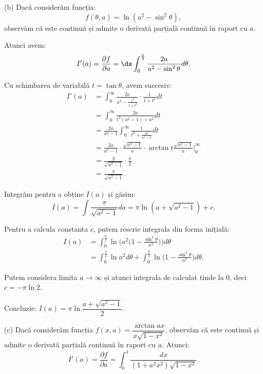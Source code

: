 \vspace{0.5cm}

(b) Dacă considerăm funcția:
\[
  f(\theta, a) = \ln(a^2 - \sin^2 \theta),
\]
observăm că este continuă și admite o derivată parțială continuă în raport cu $a$.

Atunci avem:
\[
  I'(a) = \frac{\partial f}{\partial a} = \ds\int_0^{\frac{\pi}{2}} \frac{2a}{a^2 - \sin^2 \theta} d\theta.
\]

Cu schimbarea de variabilă $t = \tan \theta $, avem succesiv:
\begin{align*}
  I'(a) &= \int_0^\infty \frac{2a}{a^2 - \frac{t^2}{1 + t^2}} \cdot \frac{1}{1 + t^2} dt \\
        &= \int_0^\infty \frac{2a}{t^2(a^2 - 1) + a^2} dt \\
        &= \frac{2a}{a^2 - 1} \int_0^\infty \frac{1}{t^2 + \frac{a^2}{a^2 - 1}} dt \\
        &= \frac{2a}{a^2 - 1} \cdot \frac{\sqrt{a^2 - 1}}{a} \cdot \arctan t \frac{\sqrt{a^2 - 1}}{a} \Big|_0^\infty \\
        &= \frac{2}{\sqrt{a^2 - 1}} \cdot \frac{\pi}{2} \\
        &= \frac{\pi}{\sqrt{a^2 - 1}}.
\end{align*}

Integrăm pentru a obține $I(a)$ și găsim:
\[
  I(a) = \int \frac{\pi}{\sqrt{a^2 - 1}} da = \pi \ln(a + \sqrt{a^2 - 1}) + c.
\]

Pentru a calcula constanta $c$, putem rescrie integrala din forma inițială:
\begin{align*}
  I(a) &= \int_0^{\frac{\pi}{2}} \ln\Big( a^2\Big(1 - \frac{\sin^2 \theta}{a^2}\Big) \Big) d\theta \\
       &= \int_0^{\frac{\pi}{2}} \ln a^2 d\theta + \int_0^{\frac{\pi}{2}} \ln \Big(1 - \frac{\sin^2 \theta}{a^2} \Big) d\theta.
\end{align*}

Putem considera limita $ a \to \infty $ și atunci integrala de calculat tinde la 0, deci $ c = -\pi \ln 2 $.

Concluzie: $ I(a) = \pi \ln \dfrac{a + \sqrt{a^2 - 1}}{2} $.

\vspace{0.5cm}

(c) Dacă considerăm funcția $ f(x, a) = \dfrac{\arctan ax}{x \sqrt{1 - x^2}}$, observăm că este continuă
și admite o derivată parțială continuă în raport cu $ a $. Atunci:
\[
  I'(a) = \frac{\partial f}{\partial a} = \int_0^1 \frac{dx}{(1 + a^2 x^2) \sqrt{1 - x^2}}.
\]


